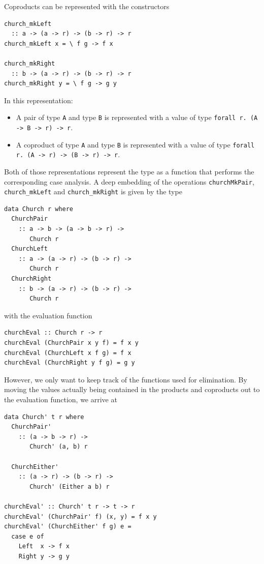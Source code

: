\documentclass[runningheads, a4paper]{llncs}
\newcommand{\ttt}{\texttt}
\begin{document}
Coproducts can be represented with the constructors

\begin{lstlisting}
church_mkLeft
  :: a -> (a -> r) -> (b -> r) -> r
church_mkLeft x = \ f g -> f x

church_mkRight
  :: b -> (a -> r) -> (b -> r) -> r
church_mkRight y = \ f g -> g y
\end{lstlisting}

In this representation:

\begin{itemize}
  \item A pair of type \ttt{A} and type \ttt{B} is represented with a value of type
\ttt{forall r. (A -> B -> r) -> r}.

  \item A coproduct of type \ttt{A} and type \ttt{B} is represented with a value of type
\ttt{forall r. (A -> r) -> (B -> r) -> r}.
\end{itemize}

Both of those representations represent the type as a function that performs the
corresponding case analysis. A deep embedding of the operations
\ttt{churchMkPair}, \ttt{church\_mkLeft} and \ttt{church\_mkRight} is given
by the type

\begin{lstlisting}
data Church r where
  ChurchPair
    :: a -> b -> (a -> b -> r) ->
       Church r
  ChurchLeft
    :: a -> (a -> r) -> (b -> r) ->
       Church r
  ChurchRight
    :: b -> (a -> r) -> (b -> r) ->
       Church r
\end{lstlisting}

with the evaluation function

\begin{lstlisting}
churchEval :: Church r -> r
churchEval (ChurchPair x y f) = f x y
churchEval (ChurchLeft x f g) = f x
churchEval (ChurchRight y f g) = g y
\end{lstlisting}

However, we only want to keep track of the functions used for elimination. By moving
the values actually being contained in the products and coproducts out to the
evaluation function, we arrive at

\begin{lstlisting}
data Church' t r where
  ChurchPair'
    :: (a -> b -> r) ->
       Church' (a, b) r

  ChurchEither'
    :: (a -> r) -> (b -> r) ->
       Church' (Either a b) r

churchEval' :: Church' t r -> t -> r
churchEval' (ChurchPair' f) (x, y) = f x y
churchEval' (ChurchEither' f g) e =
  case e of
    Left  x -> f x
    Right y -> g y
\end{lstlisting}
\end{document}
